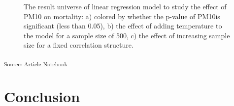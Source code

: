 \documentclass[
]{jds}
\begin{document}
\label{cell-fig-result-universe}
\begin{figure}[H]


\caption{\label{fig-result-universe}The result universe of linear
regression model to study the effect of PM10 on mortality: a) colored by
whether the p-value of PM10is significant (less than 0.05), b) the
effect of adding temperature to the model for a sample size of 500, c)
the effect of increasing sample size for a fixed correlation structure.}

\end{figure}%

\textsubscript{Source:
\href{https://huizezhang-sherry.github.io/paper-analysis-plan/index.qmd.html}{Article
Notebook}}

\section{Conclusion}\label{sec-conclusion}


\renewcommand\refname{References}
  
\end{document}
